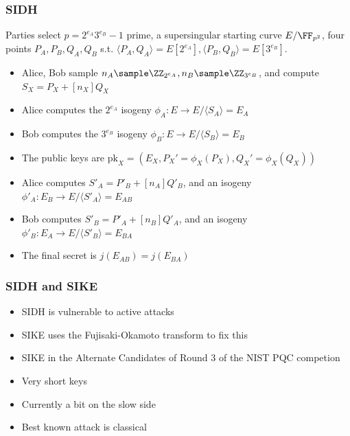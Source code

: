 \documentclass{beamer}
\begin{document}
\begin{frame}
    \frametitle{SIDH}
    Parties select $p = 2^{e_A} 3^{e_B} - 1$ prime,
     a supersingular starting curve $E/\FF_{p^2}$,
     four points $P_A, P_B, Q_A, Q_B$ s.t.
    $\langle P_A, Q_A \rangle = E[2^{e_A}], \langle P_B, Q_B \rangle = E[3^{e_B}]$.
    \begin{itemize}
        \item Alice, Bob sample $n_A \sample \ZZ_{2^{e_A}}, n_B \sample \ZZ_{3^{e_B}}$, and compute $S_{X} = P_X + [n_X]Q_X$
        \item Alice computes the $2^{e_A}$ isogeny $\phi_A: E \to E/\langle S_A\rangle = E_A$
        \item Bob computes the $3^{e_B}$ isogeny $\phi_B: E \to E/\langle S_B\rangle = E_B$
        \item The public keys are $\mathrm{pk}_X = \left(E_X, P_X' = \phi_X(P_X), Q_X' = \phi_X(Q_X)\right)$
        \item Alice computes $S'_A = P'_B + [n_A] Q'_B$, and an isogeny $\phi'_A : E_B \to E/\langle S'_A \rangle = E_{AB}$
        \item Bob computes $S'_B = P'_A + [n_B] Q'_A$, and an isogeny $\phi'_B : E_A \to E/\langle S'_B \rangle = E_{BA}$
        \item The final secret is $j(E_{AB}) = j(E_{BA})$
    \end{itemize}
\end{frame}

\begin{frame}
    \frametitle{SIDH and SIKE}
    \begin{itemize}
        \item SIDH is vulnerable to active attacks
        \item SIKE uses the Fujisaki-Okamoto transform to fix this 
        \item SIKE in the Alternate Candidates of Round 3 of the NIST PQC competion
        \item Very short keys
        \item Currently a bit on the slow side
        \item Best known attack is classical
    \end{itemize} 
\end{frame}
\end{document}
